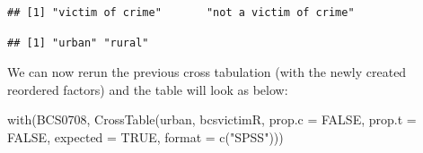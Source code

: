 \documentclass[
]{book}
\newenvironment{Shaded}{\begin{snugshade}}{\end{snugshade}}
\newcommand{\AttributeTok}[1]{\textcolor[rgb]{0.77,0.63,0.00}{#1}}
\newcommand{\ConstantTok}[1]{\textcolor[rgb]{0.00,0.00,0.00}{#1}}
\newcommand{\FunctionTok}[1]{\textcolor[rgb]{0.00,0.00,0.00}{#1}}
\newcommand{\NormalTok}[1]{#1}
\newcommand{\OtherTok}[1]{\textcolor[rgb]{0.56,0.35,0.01}{#1}}
\newcommand{\SpecialCharTok}[1]{\textcolor[rgb]{0.00,0.00,0.00}{#1}}
\newcommand{\StringTok}[1]{\textcolor[rgb]{0.31,0.60,0.02}{#1}}
\begin{document}
\begin{verbatim}
## [1] "victim of crime"       "not a victim of crime"
\end{verbatim}

\begin{Shaded}
\end{Shaded}

\begin{verbatim}
## [1] "urban" "rural"
\end{verbatim}

We can now rerun the previous cross tabulation (with the newly created reordered factors) and the table will look as below:

\begin{Shaded}
\begin{Highlighting}[]
\FunctionTok{with}\NormalTok{(BCS0708, }\FunctionTok{CrossTable}\NormalTok{(urban, bcsvictimR, }\AttributeTok{prop.c =} \ConstantTok{FALSE}\NormalTok{, }\AttributeTok{prop.t =} \ConstantTok{FALSE}\NormalTok{, }\AttributeTok{expected =} \ConstantTok{TRUE}\NormalTok{, }\AttributeTok{format =} \FunctionTok{c}\NormalTok{(}\StringTok{"SPSS"}\NormalTok{)))}
\end{Highlighting}
\end{Shaded}
\end{document}
